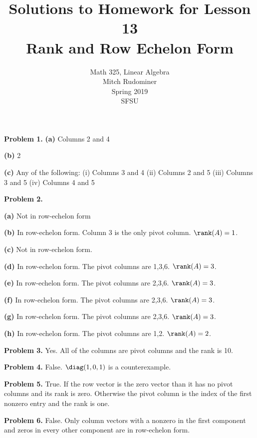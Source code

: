 \documentclass[oneside,12pt]{amsart}
\begin{document}
\title{Solutions to Homework for Lesson 13 \\ Rank and Row Echelon Form}
\author{Math 325, Linear Algebra \\ Mitch Rudominer \\ Spring 2019 \\ SFSU }
\date{}

\maketitle


\textbf{Problem 1.}
\textbf{(a)} Columns 2 and 4

\medskip

\textbf{(b)} 2

\medskip

\textbf{(c)} Any of the following:
(i) Columns 3 and 4
(ii) Columns 2 and 5
(iii) Columns 3 and 5
(iv) Columns 4 and 5

\bigskip

\textbf{Problem 2.}

\medskip


\medskip
\textbf{(a)} Not in row-echelon form

\medskip

\textbf{(b)} In row-echelon form. Column 3 is the only pivot column.
$\rank(A)=1$.

\medskip

\textbf{(c)} Not in row-echelon form.

\medskip

\textbf{(d)} In row-echelon form. The pivot columns are 1,3,6.
$\rank(A)=3$.

\medskip

\textbf{(e)} In row-echelon form. The pivot columns are 2,3,6.
$\rank(A)=3$.

\medskip

\textbf{(f)} In row-echelon form. The pivot columns are 2,3,6.
$\rank(A)=3$.

\medskip

\textbf{(g)} In row-echelon form. The pivot columns are 2,3,6.
$\rank(A)=3$.

\medskip

\textbf{(h)} In row-echelon form. The pivot columns are 1,2.
$\rank(A)=2$.

\bigskip
\bigskip

\textbf{Problem 3.} Yes. All of the columns are pivot columns and the rank is 10.

\bigskip
\bigskip

\textbf{Problem 4.} False. $\diag(1,0,1)$ is a counterexample.

\bigskip
\bigskip

\textbf{Problem 5.} True. If the row vector is the zero vector than it has no
pivot columns and its rank is zero. Otherwise the pivot column is the
index of the first nonzero entry and the rank is one.

\bigskip
\bigskip

\textbf{Problem 6.} False. Only column vectors with a nonzero in the first component
and zeros in every other component are in row-echelon form.
\end{document}
